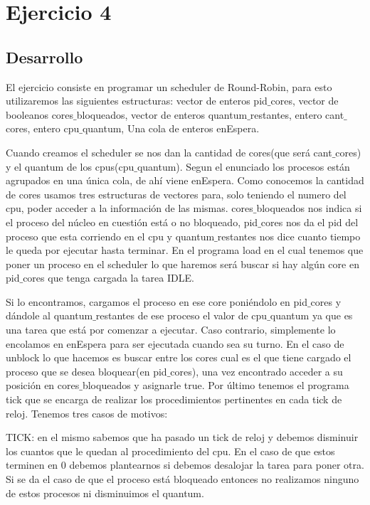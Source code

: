 \section{Ejercicio 4}

\subsection{Desarrollo}
El ejercicio consiste en programar un scheduler de Round-Robin, para esto utilizaremos las siguientes estructuras: vector de enteros pid$\_$cores, vector de booleanos cores$\_$bloqueados, vector de enteros quantum$\_$restantes, entero cant$\_$cores, entero cpu$\_$quantum, Una cola de enteros enEspera.

Cuando creamos el scheduler se nos dan la cantidad de cores(que será cant$\_$cores) y el quantum de los cpus(cpu$\_$quantum). Segun el enunciado los procesos están agrupados en una única cola, de ahí viene enEspera. Como conocemos la cantidad de cores usamos tres estructuras de vectores para, solo teniendo el numero del cpu, poder acceder a la información de las mismas. cores$\_$bloqueados nos indica si el proceso del núcleo en cuestión está o no bloqueado, pid$\_$cores nos da el pid del proceso que esta corriendo en el cpu y quantum$\_$restantes nos dice cuanto tiempo le queda por ejecutar hasta terminar.
En el programa load en el cual tenemos que poner un proceso en el scheduler lo que haremos será buscar si hay algún core en pid$\_$cores que tenga cargada la tarea IDLE.
 
Si lo encontramos, cargamos el proceso en ese core poniéndolo en pid$\_$cores y dándole al quantum$\_$restantes de ese proceso el valor de cpu$\_$quantum ya que es una tarea que está por comenzar a ejecutar. Caso contrario, simplemente lo encolamos en enEspera para ser ejecutada cuando sea su turno.
En el caso de unblock lo que hacemos es buscar entre los cores cual es el que tiene cargado el proceso que se desea bloquear(en pid$\_$cores), una vez encontrado acceder a su posición en cores$\_$bloqueados y asignarle true.
Por último tenemos el programa tick que se encarga de realizar los procedimientos pertinentes en cada tick de reloj. Tenemos tres casos de motivos:
 
TICK: en el mismo sabemos que ha pasado un tick de reloj y debemos disminuir los cuantos que le quedan al procedimiento del cpu. En el caso de que estos terminen en 0 debemos plantearnos si debemos desalojar la tarea para poner otra. Si se da el caso de que el proceso está bloqueado entonces no realizamos ninguno de estos procesos ni disminuimos el quantum.

